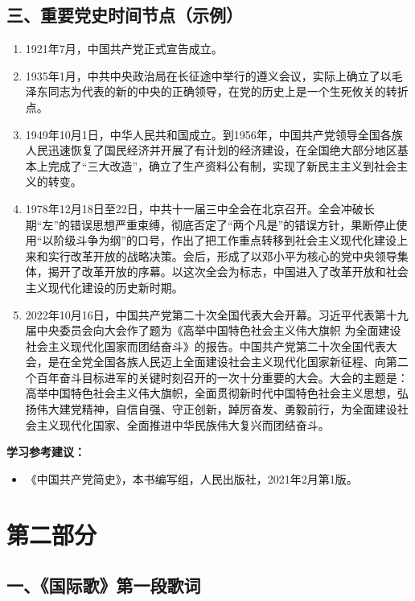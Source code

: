 \documentclass[UTF8,11pt,a4paper]{ctexart}
\begin{document}
\subsection*{三、重要党史时间节点（示例）}

\begin{enumerate}[label=\arabic*., leftmargin=2.3em]
\item 1921年7月，中国共产党正式宣告成立。
\item 1935年1月，中共中央政治局在长征途中举行的遵义会议，实际上确立了以毛泽东同志为代表的新的中央的正确领导，在党的历史上是一个生死攸关的转折点。
\item 1949年10月1日，中华人民共和国成立。到1956年，中国共产党领导全国各族人民迅速恢复了国民经济并开展了有计划的经济建设，在全国绝大部分地区基本上完成了“三大改造”，确立了生产资料公有制，实现了新民主主义到社会主义的转变。
\item 1978年12月18日至22日，中共十一届三中全会在北京召开。全会冲破长期“左”的错误思想严重束缚，彻底否定了“两个凡是”的错误方针，果断停止使用“以阶级斗争为纲”的口号，作出了把工作重点转移到社会主义现代化建设上来和实行改革开放的战略决策。会后，形成了以邓小平为核心的党中央领导集体，揭开了改革开放的序幕。以这次全会为标志，中国进入了改革开放和社会主义现代化建设的历史新时期。
\item 2022年10月16日，中国共产党第二十次全国代表大会开幕。习近平代表第十九届中央委员会向大会作了题为《高举中国特色社会主义伟大旗帜 为全面建设社会主义现代化国家而团结奋斗》的报告。中国共产党第二十次全国代表大会，是在全党全国各族人民迈上全面建设社会主义现代化国家新征程、向第二个百年奋斗目标进军的关键时刻召开的一次十分重要的大会。大会的主题是：高举中国特色社会主义伟大旗帜，全面贯彻新时代中国特色社会主义思想，弘扬伟大建党精神，自信自强、守正创新，踔厉奋发、勇毅前行，为全面建设社会主义现代化国家、全面推进中华民族伟大复兴而团结奋斗。
\end{enumerate}

\noindent\textbf{学习参考建议：}
\begin{itemize}[leftmargin=2em,label={}]
\item 《中国共产党简史》，本书编写组，人民出版社，2021年2月第1版。
\end{itemize}

\section*{第二部分}

\subsection*{一、《国际歌》第一段歌词}
\end{document}
